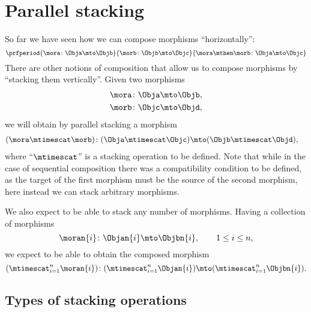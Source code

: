 
\section{Parallel stacking}
\label{sec:parallel-stacking}

So far we have seen how we can compose morphisms ``horizontally'':
%
\begin{equation}
    \prfperiod{
        \mora \colon \Obja \mto \Objb
    }{
        \morb\colon \Objb \mto \Objc
    }{
        \mora \mthen \morb \colon \Obja \mto \Objc
    }
\end{equation}
%
There are other notions of composition that allow us to compose morphisms by ``stacking them vertically''.
Given two morphisms
%
\begin{align}
    \mora & \colon \Obja \mto \Objb, \\
    \morb & \colon \Objc \mto \Objd,
\end{align}
%
we will obtain by parallel stacking a morphism
%
\begin{align}
    (\mora\mtimescat \morb)
     & \colon (\Obja \mtimescat \Objc) \mto (\Objb \mtimescat \Objd),
\end{align}
%
where ``$\mtimescat$'' is a stacking operation to be defined.
Note that while in the case of sequential composition there was a compatibility condition to be defined, as the target of the first morphism must be the source of the second morphism, here instead we can stack arbitrary morphisms.

We also expect to be able to stack any number of morphisms.
Having a collection of morphisms
%
\begin{equation}
    \moran{i} \colon \Objan{i} \mto \Objbn{i}, \qquad 1 \leq i \leq n,
\end{equation}
%
we expect to be able to obtain the composed morphism
%
\begin{equation}
    (\mtimescat_{i=1}^n  \moran{i} )
    \colon( \mtimescat_{i=1}^n  \Objan{i} )\mto (\mtimescat_{i=1}^n  \Objbn{i}).
\end{equation}

\subsection{Types of stacking operations}


